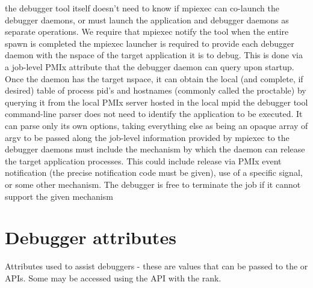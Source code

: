     the debugger tool itself doesn’t need to know if mpiexec can co-launch the debugger daemons, or must launch the application and debugger daemons as separate operations. We require that mpiexec notify the tool when the entire spawn is completed
    the mpiexec launcher is required to provide each debugger daemon with the nspace of the target application it is to debug. This is done via a job-level PMIx attribute that the debugger daemon can query upon startup. Once the daemon has the target nspace, it can obtain the local (and complete, if desired) table of process pid’s and hostnames (commonly called the proctable) by querying it from the local PMIx server hosted in the local mpid
    the debugger tool command-line parser does not need to identify the application to be executed. It can parse only its own options, taking everything else as being an opaque array of argv to be passed along
    the job-level information provided by mpiexec to the debugger daemons must include the mechanism by which the daemon can release the target application processes. This could include release via PMIx event notification (the precise notification code must be given), use of a specific signal, or some other mechanism. The debugger is free to terminate the job if it cannot support the given mechanism


\section{Debugger attributes}
\label{api:struct:attributes:debugger}

Attributes used to assist debuggers - these are values that can be passed to the  or  \acp{API}. Some may be accessed using the  \ac{API} with the  rank.

%

%

